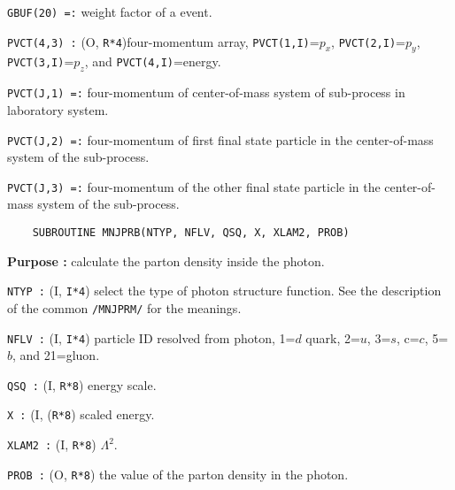 \begin{list}{ }{\parsep=0pt \itemsep=0pt \topsep=0pt }
\begin{list}{ }{\parsep=0pt \itemsep=0pt \topsep=0pt }
  \item[\tt GBUF(20) =:] weight factor of a event.
  \end{list}  
\item[\tt PVCT(4,3) :] (O, {\tt R*4})four-momentum array, {\tt PVCT(1,I)}=$p_x$,
 {\tt PVCT(2,I)}=$p_y$, {\tt PVCT(3,I)}=$p_z$,
and  {\tt PVCT(4,I)}=energy.
  \begin{list}{ }{\parsep=0pt \itemsep=0pt \topsep=0pt }
  \item[ \tt PVCT(J,1) =:] four-momentum of center-of-mass system of
sub-process in laboratory system.
  \item[ \tt PVCT(J,2) =:] four-momentum of first final state particle in
the center-of-mass system of the sub-process.
  \item[ \tt PVCT(J,3) =:] four-momentum of the other final state particle in
the center-of-mass system of the sub-process.
  \end{list}
\end{list}

{\samepage
\newlength{\MNJPRB}
\settowidth{\MNJPRB}{\tt SUBROUTINE MNJPRB(NTYP, NFLV, QSQ, X, XLAM2, PROB)}
\begin{verbatim}
    SUBROUTINE MNJPRB(NTYP, NFLV, QSQ, X, XLAM2, PROB)
\end{verbatim}
\vspace{-28pt}
\hspace*{4ex}\fbox{\rule[14pt]{\MNJPRB}{0cm}}}
\begin{list}{ }{\parsep=0pt \itemsep=0pt \topsep=0pt }
\item[\bf Purpose :] calculate the parton density inside the photon.
\item[ \tt NTYP :] (I, {\tt I*4}) 
select the type of photon structure function.
See the description of the common {\tt /MNJPRM/} for the meanings.
\item[ \tt NFLV :] (I, {\tt I*4}) particle ID resolved from photon,
1=$d$ quark, 2=$u$, 3=$s$, c=$c$, 5=$b$, and 21=gluon.  
\item[ \tt QSQ :] (I, {\tt R*8}) energy scale.
\item[ \tt X :] (I, ({\tt R*8}) scaled energy.
\item[ \tt XLAM2 :] (I, {\tt R*8}) $\Lambda^2$.
\item[ \tt PROB :] (O, {\tt R*8}) the value of the parton density in
the photon.
\end{list}



